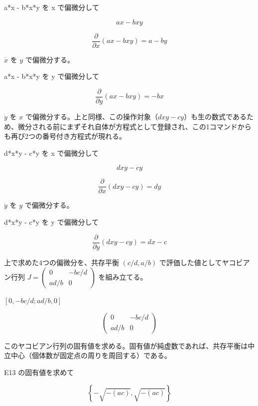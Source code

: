 \documentclass[dvipdfmx,a4paper,11pt]{jsarticle}
\begin{document}
a*x - b*x*y を x で偏微分して

\begin{equation}
  a x - b x y
  \label{eq:E7}
\end{equation}

\begin{equation}
  \frac{\partial}{\partial x}\left(a x - b x y\right) = a-b y
  \label{eq:E8}
\end{equation}

$\dot x$ を $y$ で偏微分する。

a*x - b*x*y を y で偏微分して

\begin{equation}
  \frac{\partial}{\partial y}\left(a x - b x y\right) = -b x
  \label{eq:E9}
\end{equation}

$\dot y$ を $x$ で偏微分する。上と同様、この操作対象（$dxy-cy$）も生の数式であるため、微分される前にまずそれ自体が方程式として登録され、この1コマンドからも再び2つの番号付き方程式が現れる。

d*x*y - c*y を x で偏微分して

\begin{equation}
  d x y - c y
  \label{eq:E10}
\end{equation}

\begin{equation}
  \frac{\partial}{\partial x}\left(d x y - c y\right) = d y
  \label{eq:E11}
\end{equation}

$\dot y$ を $y$ で偏微分する。

d*x*y - c*y を y で偏微分して

\begin{equation}
  \frac{\partial}{\partial y}\left(d x y - c y\right) = d x-c
  \label{eq:E12}
\end{equation}

上で求めた4つの偏微分を、共存平衡 $(c/d,a/b)$ で評価した値としてヤコビアン行列 $J=\begin{pmatrix}0&-bc/d\\ad/b&0\end{pmatrix}$ を組み立てる。

$[0, -b c/d; a d/b, 0]$

\begin{equation}
  \begin{pmatrix} 0 & -b c/d \\ a d/b & 0 \end{pmatrix}
  \label{eq:E13}
\end{equation}

このヤコビアン行列の固有値を求める。固有値が純虚数であれば、共存平衡は中立中心（個体数が固定点の周りを周回する）である。

E13 の固有値を求めて

\begin{equation}
  \left\{ -\sqrt{-\left(a c\right)} , \sqrt{-\left(a c\right)} \right\}
  \label{eq:E14}
\end{equation}
\end{document}
